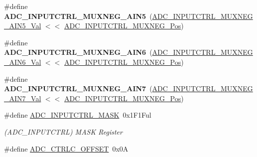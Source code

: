 \begin{DoxyCompactItemize}
\item 
\hypertarget{group___s_a_m_l21___a_d_c_ga6c202d1e6f5e37e6aafebf8431f3b591}{}\#define {\bfseries A\+D\+C\+\_\+\+I\+N\+P\+U\+T\+C\+T\+R\+L\+\_\+\+M\+U\+X\+N\+E\+G\+\_\+\+A\+I\+N5}~(\hyperlink{group___s_a_m_l21___a_d_c_ga69a5997a4dfb766d498952d9d402d288}{A\+D\+C\+\_\+\+I\+N\+P\+U\+T\+C\+T\+R\+L\+\_\+\+M\+U\+X\+N\+E\+G\+\_\+\+A\+I\+N5\+\_\+\+Val} $<$$<$ \hyperlink{group___s_a_m_l21___a_d_c_ga47f933ef105812dd56ccffab8f7a0877}{A\+D\+C\+\_\+\+I\+N\+P\+U\+T\+C\+T\+R\+L\+\_\+\+M\+U\+X\+N\+E\+G\+\_\+\+Pos})\label{group___s_a_m_l21___a_d_c_ga6c202d1e6f5e37e6aafebf8431f3b591}

\item 
\hypertarget{group___s_a_m_l21___a_d_c_ga4c5e3cc54b0c653bb7e963819b8991c9}{}\#define {\bfseries A\+D\+C\+\_\+\+I\+N\+P\+U\+T\+C\+T\+R\+L\+\_\+\+M\+U\+X\+N\+E\+G\+\_\+\+A\+I\+N6}~(\hyperlink{group___s_a_m_l21___a_d_c_ga879062c4bac98ffbe47d11665f9e978a}{A\+D\+C\+\_\+\+I\+N\+P\+U\+T\+C\+T\+R\+L\+\_\+\+M\+U\+X\+N\+E\+G\+\_\+\+A\+I\+N6\+\_\+\+Val} $<$$<$ \hyperlink{group___s_a_m_l21___a_d_c_ga47f933ef105812dd56ccffab8f7a0877}{A\+D\+C\+\_\+\+I\+N\+P\+U\+T\+C\+T\+R\+L\+\_\+\+M\+U\+X\+N\+E\+G\+\_\+\+Pos})\label{group___s_a_m_l21___a_d_c_ga4c5e3cc54b0c653bb7e963819b8991c9}

\item 
\hypertarget{group___s_a_m_l21___a_d_c_gaa9f7778308835664ef3428aee8058532}{}\#define {\bfseries A\+D\+C\+\_\+\+I\+N\+P\+U\+T\+C\+T\+R\+L\+\_\+\+M\+U\+X\+N\+E\+G\+\_\+\+A\+I\+N7}~(\hyperlink{group___s_a_m_l21___a_d_c_ga95bc808b5e5ac3789c0fdf6c9b9e01b0}{A\+D\+C\+\_\+\+I\+N\+P\+U\+T\+C\+T\+R\+L\+\_\+\+M\+U\+X\+N\+E\+G\+\_\+\+A\+I\+N7\+\_\+\+Val} $<$$<$ \hyperlink{group___s_a_m_l21___a_d_c_ga47f933ef105812dd56ccffab8f7a0877}{A\+D\+C\+\_\+\+I\+N\+P\+U\+T\+C\+T\+R\+L\+\_\+\+M\+U\+X\+N\+E\+G\+\_\+\+Pos})\label{group___s_a_m_l21___a_d_c_gaa9f7778308835664ef3428aee8058532}

\item 
\hypertarget{group___s_a_m_l21___a_d_c_ga05f6805f807d0dac42fcaba65dcc8a41}{}\#define \hyperlink{group___s_a_m_l21___a_d_c_ga05f6805f807d0dac42fcaba65dcc8a41}{A\+D\+C\+\_\+\+I\+N\+P\+U\+T\+C\+T\+R\+L\+\_\+\+M\+A\+S\+K}~0x1\+F1\+Ful\label{group___s_a_m_l21___a_d_c_ga05f6805f807d0dac42fcaba65dcc8a41}

\begin{DoxyCompactList}\small\item\em (A\+D\+C\+\_\+\+I\+N\+P\+U\+T\+C\+T\+R\+L) M\+A\+S\+K Register \end{DoxyCompactList}\item 
\hypertarget{group___s_a_m_l21___a_d_c_gae97b0ab4ba039ba97400a373fc8f156d}{}\#define \hyperlink{group___s_a_m_l21___a_d_c_gae97b0ab4ba039ba97400a373fc8f156d}{A\+D\+C\+\_\+\+C\+T\+R\+L\+C\+\_\+\+O\+F\+F\+S\+E\+T}~0x0\+A\label{group___s_a_m_l21___a_d_c_gae97b0ab4ba039ba97400a373fc8f156d}


\end{DoxyCompactItemize}
